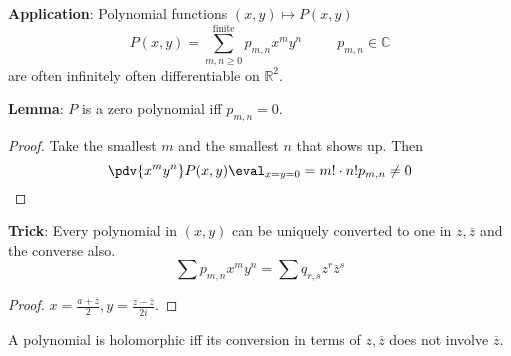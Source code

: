 \documentclass{report}
\begin{document}
\textbf{Application}: Polynomial functions $(x, y) \mapsto P(x, y)$
    \begin{equation*}
        P(x, y) = \sum_{m, n \geq 0}^{\text{finite}}p_{m, n}x^{m}y^{n} \hspace{30pt}  p_{m, n} \in \mathbb{C}
    \end{equation*}
are often infinitely often differentiable on $\mathbb{R}^{2}$.

\textbf{Lemma}: $P$ is a zero polynomial iff $p_{m, n} = 0$.
    \begin{proof}
        Take the smallest $m$ and the smallest $n$ that shows up. Then 
            \begin{equation*}
                \pdv{x^{m} y^{n}} P(x, y)\eval_{x = y = 0} = m! \cdot n! p_{m, n} \neq 0
            \end{equation*}
    \end{proof}

\textbf{Trick}: Every polynomial in $(x, y)$ can be uniquely converted to one in $z, \overline{z}$ and the converse also.
    \begin{equation*}
        \sum p_{m, n}x^{m}y^{n} = \sum q_{r, s} z^{r}\overline{z}^{s}
    \end{equation*}
    \begin{proof}
        $x = \frac{a + \overline{z}}{2}, y = \frac{z - \overline{z}}{2i}$.
    \end{proof}

A polynomial is holomorphic iff its conversion in terms of $z, \overline{z}$ does not involve $\overline{z}$.
\end{document}
